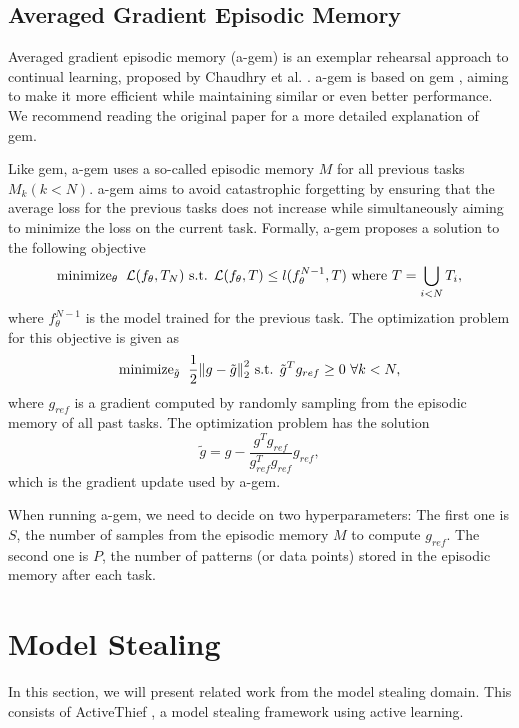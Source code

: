 \subsection{Averaged Gradient Episodic Memory}
\label{sec:Related_work:Continual_Learning:AGEM}
Averaged gradient episodic memory (\gls{a-gem}) is an exemplar rehearsal approach to continual learning, proposed by Chaudhry et al. \cite{chaudhry2018efficient}.
\gls{a-gem} is based on \gls{gem} \cite{lopez2017gradient}, aiming to make it more efficient while maintaining similar or
even better performance. We recommend reading the original paper for a more detailed explanation of \gls{gem}. \par
Like \gls{gem}, \gls{a-gem} uses a so-called episodic memory $M$ for all previous tasks $M_k (k<N)$. \gls{a-gem} aims to avoid catastrophic forgetting by ensuring
that the average loss for the previous tasks does not increase while simultaneously aiming to minimize the loss on the current task. Formally, \gls{a-gem} proposes
a solution to the following objective 
\begin{equation}
    \text{minimize}_\theta \hspace{0.2cm} \mathcal{L}(f_\theta,T_N) \text{ s.t. } \mathcal{L}(f_\theta,T) \leq l(f_\theta^{N-1},T) \text{ where } T = \bigcup_{i<N} T_i,
\end{equation}
where $f_\theta^{N-1}$ is the model trained for the previous task. The optimization problem for this objective is given as
\begin{equation}
    \text{minimize}_{\tilde{g}} \hspace{0.2cm} \frac{1}{2} {\lVert g - \tilde{g} \rVert}^2_2 \text{ s.t. } \tilde{g}^T g_{ref} \geq 0 \text{ } \forall k < N,
\end{equation}
where $g_{ref}$ is a gradient computed by randomly sampling from the episodic memory of all past tasks. The optimization problem has the solution 
\begin{equation}
    \tilde{g} = g - \frac{g^T g_{ref}}{g^T_{ref} g_{ref}} g_{ref},
\end{equation}
which is the gradient update used by \gls{a-gem}. \par
When running \gls{a-gem}, we need to decide on two hyperparameters: The first one is $S$, the number of samples from the episodic memory $M$ to compute $g_{ref}$. The second
one is $P$, the number of patterns (or data points) stored in the episodic memory after each task.


\section{Model Stealing}
\label{sec:Related_work:Model_Stealing}
In this section, we will present related work from the model stealing domain. This consists of ActiveThief \cite{pal2020activethief}, a model stealing framework using
active learning.

